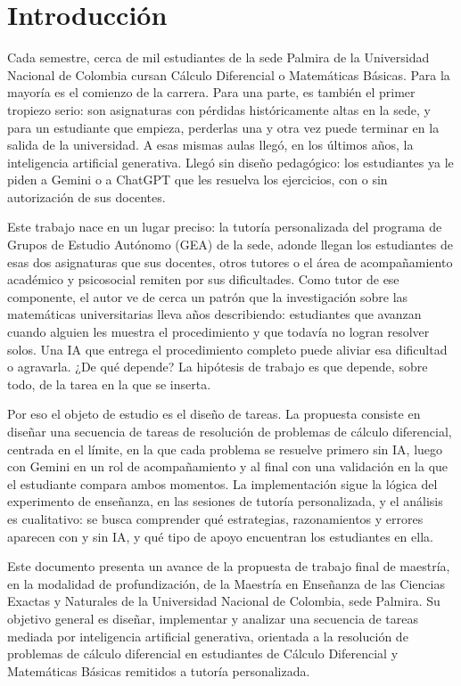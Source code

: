 \chapter*{\sffamily Introducción}


\par Cada semestre, cerca de mil estudiantes de la sede Palmira de la Universidad
Nacional de Colombia cursan Cálculo Diferencial o Matemáticas Básicas. Para la
mayoría es el comienzo de la carrera. Para una parte, es también el primer
tropiezo serio: son asignaturas con pérdidas históricamente altas en la sede, y
para un estudiante que empieza, perderlas una y otra vez puede terminar en la
salida de la universidad. A esas mismas aulas llegó, en los últimos años, la
inteligencia artificial generativa. Llegó sin diseño pedagógico: los estudiantes
ya le piden a Gemini o a ChatGPT que les resuelva los ejercicios, con o sin
autorización de sus docentes.

Este trabajo nace en un lugar preciso: la tutoría personalizada del programa de
Grupos de Estudio Autónomo (GEA) de la sede, adonde llegan los estudiantes de
esas dos asignaturas que sus docentes, otros tutores o el área de acompañamiento
académico y psicosocial remiten por sus dificultades. Como tutor de ese
componente, el autor ve de cerca un patrón que la investigación sobre las
matemáticas universitarias lleva años describiendo: estudiantes que avanzan
cuando alguien les muestra el procedimiento y que todavía no logran resolver
solos. Una IA que entrega el procedimiento completo puede aliviar esa dificultad
o agravarla. ¿De qué depende? La hipótesis de trabajo es que depende, sobre todo,
de la tarea en la que se inserta.

Por eso el objeto de estudio es el diseño de tareas. La propuesta consiste en
diseñar una secuencia de tareas de resolución de problemas de cálculo diferencial,
centrada en el límite, en la que cada problema se resuelve primero sin IA, luego
con Gemini en un rol de acompañamiento y al final con una validación en la que el
estudiante compara ambos momentos. La implementación sigue la lógica del
experimento de enseñanza, en las sesiones de tutoría personalizada, y el análisis
es cualitativo: se busca comprender qué estrategias, razonamientos y errores
aparecen con y sin IA, y qué tipo de apoyo encuentran los estudiantes en ella.

Este documento presenta un avance de la propuesta de trabajo final de maestría,
en la modalidad de profundización, de la Maestría en Enseñanza de las Ciencias
Exactas y Naturales de la Universidad Nacional de Colombia, sede Palmira. Su
objetivo general es diseñar, implementar y analizar una secuencia de tareas
mediada por inteligencia artificial generativa, orientada a la resolución de
problemas de cálculo diferencial en estudiantes de Cálculo Diferencial y
Matemáticas Básicas remitidos a tutoría personalizada.


